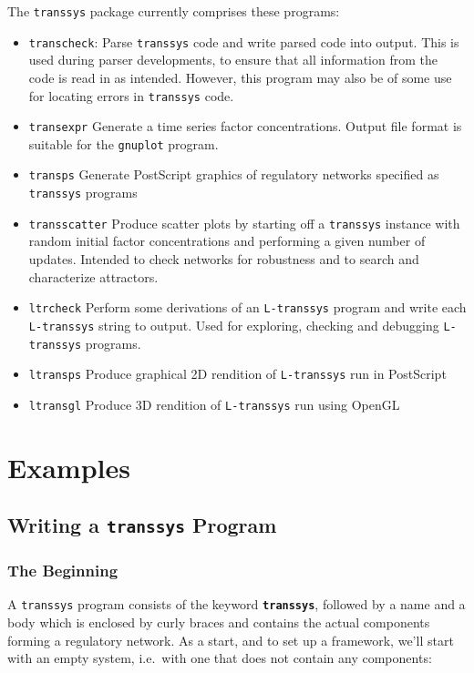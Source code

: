\documentclass[12pt]{article}
\newcommand{\transsys}{\texttt{transsys}}
\newcommand{\ltranssys}{\texttt{L-}\transsys}
\newcommand{\keyword}[1]{\textbf{\texttt{#1}}}
\newcommand{\prgname}[1]{\texttt{#1}}
\begin{document}
The \transsys{} package currently comprises these programs:
\begin{itemize}
\item \prgname{transcheck}: Parse \transsys{} code and write parsed
  code into output. This is used during parser developments, to ensure
  that all information from the code is read in as intended. However,
  this program may also be of some use for locating errors in
  \transsys{} code.
\item \prgname{transexpr} Generate a time series factor
  concentrations. Output file format is suitable for the
  \prgname{gnuplot} program.
\item \prgname{transps} Generate PostScript graphics of regulatory
  networks specified as \transsys{} programs
\item \prgname{transscatter} Produce scatter plots by starting off a
  \transsys{} instance with random initial factor concentrations and
  performing a given number of updates. Intended to check networks for
  robustness and to search and characterize attractors.
\item \prgname{ltrcheck} Perform some derivations of an \ltranssys{}
  program and write each \ltranssys{} string to output. Used for
  exploring, checking and debugging \ltranssys{} programs.
\item \prgname{ltransps} Produce graphical 2D rendition of
  \ltranssys{} run in PostScript
\item \prgname{ltransgl} Produce 3D rendition of \ltranssys{} run
  using OpenGL
\end{itemize}


\section{Examples}

\subsection{Writing a \transsys{} Program}

\subsubsection{The Beginning}

A \transsys{} program consists of the keyword \keyword{transsys},
followed by a name and a body which is enclosed by curly braces and
contains the actual components forming a regulatory network. As a
start, and to set up a framework, we'll start with an empty system,
i.e.\ with one that does not contain any components:
\end{document}
